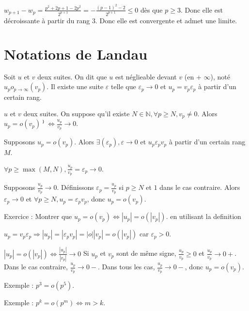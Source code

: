 \documentclass[french]{yLectureNote}
\newcommand{\N}[0]{\mathbb{N}}
\begin{document}
$w_{p+1} - w_p = \frac{p^2+2p+1-2p^2}{2^{p+1}} = -\frac{(p-1)^2-2}{2^{p+1}} \leq 0$ dès que $p\geq 3$. Donc elle est décroissante à partir du rang 3. Donc elle est convergente et admet une limite.
\section{Notations de Landau}
\begin{definition}
Soit $u$ et $v$ deux suites. On dit que $u$ est néglieable devant $v$ (en + $\infty$), noté $u_p o_{p\to\infty} (v_p)$. Il existe une suite $\varepsilon$ telle que $\varepsilon_p\to 0$ et $u_p = v_p\varepsilon_p$ à partir d'un certain rang.
\end{definition}
\begin{proposition}
$u$ et $v$ deux suites. On suppose qu'il existe $N\in\N,\forall p\geq N, v_p\neq 0$. Alors $u_p = o(v_p)⁾ \iff \frac{u_p}{v_p}\to 0$.
\end{proposition}
\begin{myproof}
Supposons $u_p = o(v_p)$. Alors $\exists (\varepsilon_p), \varepsilon\to 0$ et $u_p \varepsilon_pv_p$ à partir d'un certain rang $M$.

$\forall p\geq \max(M,N), \frac{u_p}{v_p} = \varepsilon_p \to 0$.

Supposons $\frac{u_p}{v_p} \to 0$. Définissons $\varepsilon_p = \frac{u_p}{v_p}$ si $p\geq N$ et $1$ dans le cas contraire. Alors $\varepsilon_p \to 0$ et $\forall p\geq N, u_p = \varepsilon_pv_p$, donc $u_p = o(v_p)$.
\end{myproof}
Exercice : Montrer que $u_p = o(v_p) \iff |u_p| = o(|v_p|)$. en utilisant la definition

$u_p = v_p \varepsilon_p \Rightarrow |u_p| = |\varepsilon_pv_p| = |o||v_p| = o(|v_p|)$ car $\varepsilon_p>0$.

$|u_p| = o(|v_p|) \iff \frac{|u_p|}{|v_p|} \to 0$ Si $u_p$ et $v_p$ sont de m\^eme signe, $\frac{u_p}{v_p} \geq 0$ et $\frac{u_p}{v_p} \to 0+$. Dans le cas contraire, $\frac{u_p}{v_p} \to 0-$. Dans tous les cas, $\frac{u_p}{v_p} \to 0-$, donc $u_p = o(v_p)$.




Exemple : $p^3 = o(p^5)$.

Exemple : $p^k = o(p^m) \iff m > k$.
\end{document}
